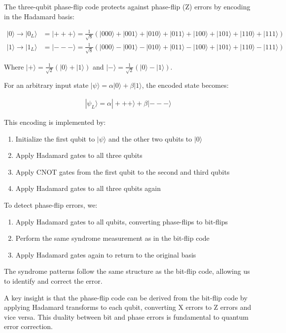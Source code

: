 \documentclass[12pt,a4paper]{article}
\begin{document}
The three-qubit phase-flip code protects against phase-flip (Z) errors by encoding in the Hadamard basis:

\begin{align}
|0\rangle \rightarrow |0_L\rangle &= |+++\rangle = \frac{1}{\sqrt{8}}(|000\rangle + |001\rangle + |010\rangle + |011\rangle + |100\rangle + |101\rangle + |110\rangle + |111\rangle)\\
|1\rangle \rightarrow |1_L\rangle &= |---\rangle = \frac{1}{\sqrt{8}}(|000\rangle - |001\rangle - |010\rangle + |011\rangle - |100\rangle + |101\rangle + |110\rangle - |111\rangle)
\end{align}

Where $|+\rangle = \frac{1}{\sqrt{2}}(|0\rangle + |1\rangle)$ and $|-\rangle = \frac{1}{\sqrt{2}}(|0\rangle - |1\rangle)$.

For an arbitrary input state $|\psi\rangle = \alpha|0\rangle + \beta|1\rangle$, the encoded state becomes:

\begin{align}
|\psi_L\rangle = \alpha|+++\rangle + \beta|---\rangle
\end{align}

This encoding is implemented by:
\begin{enumerate}
    \item Initialize the first qubit to $|\psi\rangle$ and the other two qubits to $|0\rangle$
    \item Apply Hadamard gates to all three qubits
    \item Apply CNOT gates from the first qubit to the second and third qubits
    \item Apply Hadamard gates to all three qubits again
\end{enumerate}

To detect phase-flip errors, we:
\begin{enumerate}
    \item Apply Hadamard gates to all qubits, converting phase-flips to bit-flips
    \item Perform the same syndrome measurement as in the bit-flip code
    \item Apply Hadamard gates again to return to the original basis
\end{enumerate}

The syndrome patterns follow the same structure as the bit-flip code, allowing us to identify and correct the error.

A key insight is that the phase-flip code can be derived from the bit-flip code by applying Hadamard transforms to each qubit, converting X errors to Z errors and vice versa. This duality between bit and phase errors is fundamental to quantum error correction.
\end{document}
